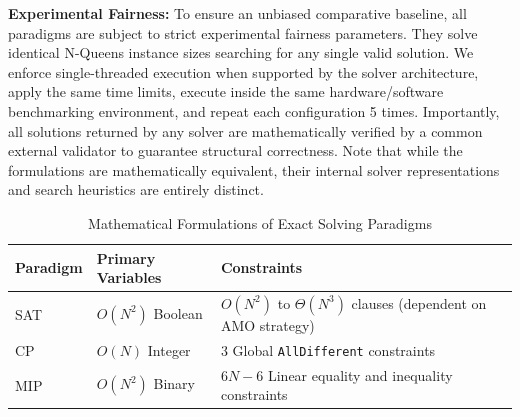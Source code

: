 \textbf{Experimental Fairness:} To ensure an unbiased comparative baseline, all paradigms are subject to strict experimental fairness parameters. They solve identical N-Queens instance sizes searching for any single valid solution. We enforce single-threaded execution when supported by the solver architecture, apply the same time limits, execute inside the same hardware/software benchmarking environment, and repeat each configuration 5 times. Importantly, all solutions returned by any solver are mathematically verified by a common external validator to guarantee structural correctness. Note that while the formulations are mathematically equivalent, their internal solver representations and search heuristics are entirely distinct.

\begin{table}[h]
\centering
\caption{Mathematical Formulations of Exact Solving Paradigms}
\begin{tabular}{@{}llp{8cm}@{}}
\toprule
Paradigm & Primary Variables & Constraints \\
\midrule
SAT & $O(N^2)$ Boolean & $O(N^2)$ to $\Theta(N^3)$ clauses (dependent on AMO strategy) \\
CP & $O(N)$ Integer & 3 Global \texttt{AllDifferent} constraints \\
MIP & $O(N^2)$ Binary & $6N-6$ Linear equality and inequality constraints \\
\bottomrule
\end{tabular}
\label{tab:formulations}
\end{table}
